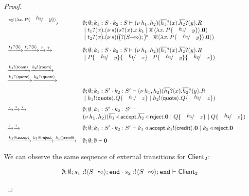 \begin{proof}
\[\begin{array}{ll}
		\by{\bactout{s_2}{\abs{x}{P \subst{h_2}{y}}}}&
		\es; \es; k_1: S \cat k_2: S \proves \newsp{h_1, h_2}{
		\binp{\dual{h_1}}{x} \binp{\dual{h_2}}{y} R\\
		& \Par \binp{t_1}{x} \newsp{s}{\binp{s}{x} \appl{x}{k_1} \Par \bout{\dual{s}}{\abs{x}{P \subst{h_1}{y}}} \inact }\\
		& \Par \binp{t_2}{x} \newsp{s}{\mapchar{\btinp{\lhot{S}}}{s} \Par \bout{\dual{s}}{\abs{x}{P \subst{h_2}{y}}} \inact }}
		\\[2mm]

		\by{\bactinp{t_1}{b}} \by{\bactinp{t_2}{b}} \by{\tau}\by{\tau}&
		\es; \es; k_1: S \cat k_2: S \proves \newsp{h_1, h_2}{
		\binp{\dual{h_1}}{x} \binp{\dual{h_2}}{y} R\\
		& \Par P\subst{h_1}{y} \subst{k_1}{x} \Par P\subst{h_1}{y} \subst{k_2}{x}}
		\\[2mm]

		\by{\bactout{k_1}{\rtype}} \by{\bactout{k_2}{\rtype}}\\
		\by{\bactinp{k_1}{\Quote}} \by{\bactinp{k_2}{\Quote}}
		\\[2mm]

		& \es; \es; k_1: S' \cat k_2: S' \proves \newsp{h_1, h_2}{
		\binp{\dual{h_1}}{x} \binp{\dual{h_2}}{y} R\\
		& \Par \bout{h_1}{\Quote} Q \subst{h_1}{z} \Par \bout{h_2}{\Quote} Q \subst{h_2}{z}}
		\\[2mm]

		\by{\tau} \by{\tau} \by{\tau}&
		\es; \es; k_1: S' \cat k_2: S' \proves \\
		& \newsp{h_1, h_2}{\bsel{\dual{h_1}}{\accept} \bsel{\dual{h_2}}{\reject} \inact
		\Par Q \subst{h_1}{z} \Par Q \subst{h_2}{z}}
		\\[2mm]

		\by{\tau} \by{\tau}&
		\es; \es; k_1: S' \cat k_2: S' \proves
		\bsel{k_1}{\accept} \bout{k_1}{\creditc} \inact 
		\Par \bsel{k_2}{\reject} \inact
		\\[2mm]

		\by{\bactsel{k_1}{\accept}} \by{\bactsel{k_2}{\reject}} \by{\bactsel{k_1}{\creditc}}&
		\es; \es; \es \proves \inact
	\end{array}
\]

	We can observe the same sequence of external transitions for $\mathsf{Client}_2$:

\[
	\begin{array}{ll}
		& \es; \es; s_1: \btout{\lhot{S}} \tinact \cat s_2: \btout{\lhot{S}} \tinact \proves \Client_2
\\[2mm]


\end{array}\]
\end{proof}
